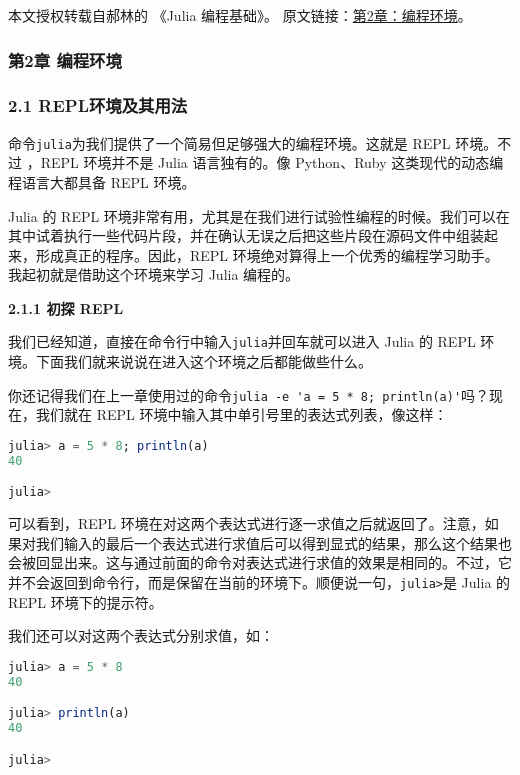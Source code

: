 
本文授权转载自郝林的 《Julia 编程基础》。 原文链接：\href{https://github.com/hyper0x/JuliaBasics/blob/master/book/ch02.md}{第2章：编程环境}。


\subsubsection{第2章  编程环境}

\subsubsection{2.1 REPL环境及其用法}

命令\verb|julia|为我们提供了一个简易但足够强大的编程环境。这就是 REPL 环境。不过
，REPL 环境并不是 Julia 语言独有的。像 Python、Ruby 这类现代的动态编程语言大都具备 REPL 环境。

Julia 的 REPL 环境非常有用，尤其是在我们进行试验性编程的时候。我们可以在其中试着执行一些代码片段，并在确认无误之后把这些片段在源码文件中组装起来，形成真正的程序。因此，REPL 环境绝对算得上一个优秀的编程学习助手。我起初就是借助这个环境来学习 Julia 编程的。

\textbf{2.1.1 初探 REPL}

我们已经知道，直接在命令行中输入\verb|julia|并回车就可以进入 Julia 的 REPL 环境。下面我们就来说说在进入这个环境之后都能做些什么。

你还记得我们在上一章使用过的命令\verb|julia -e 'a = 5 * 8; println(a)'|吗？现在，我们就在 REPL 环境中输入其中单引号里的表达式列表，像这样：

\begin{lstlisting}[language=julia]
julia> a = 5 * 8; println(a)
40

julia>
\end{lstlisting}

可以看到，REPL 环境在对这两个表达式进行逐一求值之后就返回了。注意，如果对我们输入的最后一个表达式进行求值后可以得到显式的结果，那么这个结果也会被回显出来。这与通过前面的命令对表达式进行求值的效果是相同的。不过，它并不会返回到命令行，而是保留在当前的环境下。顺便说一句，\verb|julia>|是 Julia 的 REPL 环境下的提示符。

我们还可以对这两个表达式分别求值，如：

\begin{lstlisting}[language=julia]
julia> a = 5 * 8
40

julia> println(a)
40

julia> 
\end{lstlisting}

